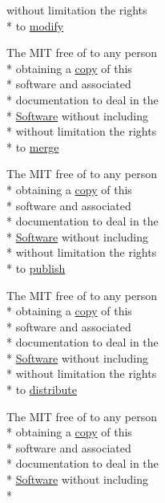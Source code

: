 \begin{DoxyCompactItemize}
without limitation the rights \\*
to \hyperlink{LICENSE_8txt_a4f5fee3fe655fc467fc80425521837ae}{modify}
\item 
The M\-I\-T free of to any person \\*
obtaining a \hyperlink{LICENSE_8txt_aff1d4c6b756ebf691fa44a0904f68658}{copy} of this \\*
software and associated \\*
documentation to deal in the \\*
\hyperlink{LICENSE_8txt_a22a1529885b3e9d66b0c72fe604fc3dc}{Software} without including \\*
without limitation the rights \\*
to \hyperlink{LICENSE_8txt_a7653d3ec339e97ccc64ec4f74e440441}{merge}
\item 
The M\-I\-T free of to any person \\*
obtaining a \hyperlink{LICENSE_8txt_aff1d4c6b756ebf691fa44a0904f68658}{copy} of this \\*
software and associated \\*
documentation to deal in the \\*
\hyperlink{LICENSE_8txt_a22a1529885b3e9d66b0c72fe604fc3dc}{Software} without including \\*
without limitation the rights \\*
to \hyperlink{LICENSE_8txt_ae6b6c4d3ae1a4140d31294e27bb0ebd8}{publish}
\item 
The M\-I\-T free of to any person \\*
obtaining a \hyperlink{LICENSE_8txt_aff1d4c6b756ebf691fa44a0904f68658}{copy} of this \\*
software and associated \\*
documentation to deal in the \\*
\hyperlink{LICENSE_8txt_a22a1529885b3e9d66b0c72fe604fc3dc}{Software} without including \\*
without limitation the rights \\*
to \hyperlink{LICENSE_8txt_ad8444ae07f9fa7b3e3e0cf4dc4551114}{distribute}
\item 
The M\-I\-T free of to any person \\*
obtaining a \hyperlink{LICENSE_8txt_aff1d4c6b756ebf691fa44a0904f68658}{copy} of this \\*
software and associated \\*
documentation to deal in the \\*
\hyperlink{LICENSE_8txt_a22a1529885b3e9d66b0c72fe604fc3dc}{Software} without including \\*

\end{DoxyCompactItemize}
